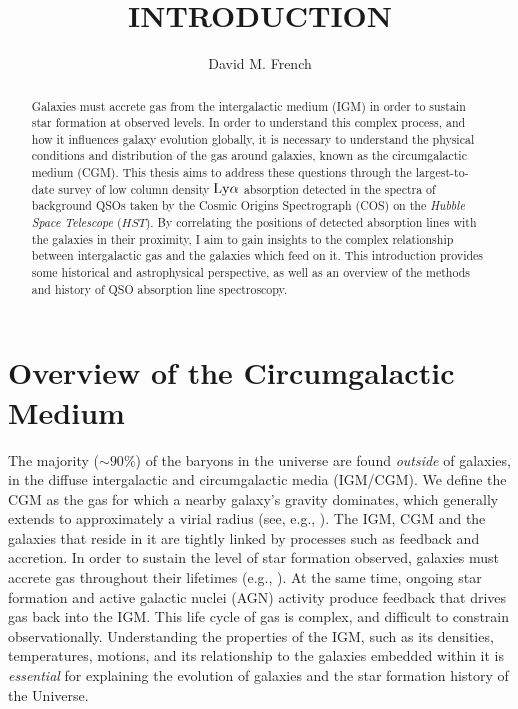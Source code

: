 \documentclass[twocolumn,tighten]{aastex62}
\begin{document}
\title{INTRODUCTION}



\author{David M. French}


\begin{abstract}

Galaxies must accrete gas from the intergalactic medium (IGM) in order to sustain star formation at observed levels. In order to understand this complex process, and how it influences galaxy evolution globally, it is necessary to understand the physical conditions and distribution of the gas around galaxies, known as the circumgalactic medium (CGM). This thesis aims to address these questions through the largest-to-date survey of low column density $\rm Ly\alpha$ absorption detected in the spectra of background QSOs taken by the Cosmic Origins Spectrograph (COS) on the \emph{Hubble Space Telescope} ($HST$). By correlating the positions of detected absorption lines with the galaxies in their proximity, I aim to gain insights to the complex relationship between intergalactic gas and the galaxies which feed on it. This introduction provides some historical and astrophysical perspective, as well as an overview of the methods and history of QSO absorption line spectroscopy.

\end{abstract}



\section{Overview of the Circumgalactic Medium}

The majority ($\sim 90\%$) of the baryons in the universe are found \emph{outside} of galaxies, in the diffuse intergalactic and circumgalactic media (IGM/CGM). We define the CGM as the gas for which a nearby galaxy's gravity dominates, which generally extends to approximately a virial radius (see, e.g., \citealt{shull2014}). The IGM, CGM and the galaxies that reside in it are tightly linked by processes such as feedback and accretion. In order to sustain the level of star formation observed, galaxies must accrete gas throughout their lifetimes (e.g., \citealt{oort1966, oort1969, oort1970, tinsley1978, tinsley1980, wakker1999, erb2008, prochaska2009}). At the same time, ongoing star formation and active galactic nuclei (AGN) activity produce feedback that drives gas back into the IGM. This life cycle of gas is complex, and difficult to constrain observationally. Understanding the properties of the IGM, such as its densities, temperatures, motions, and its relationship to the galaxies embedded within it is \emph{essential} for explaining the evolution of galaxies and the star formation history of the Universe. 
\end{document}
